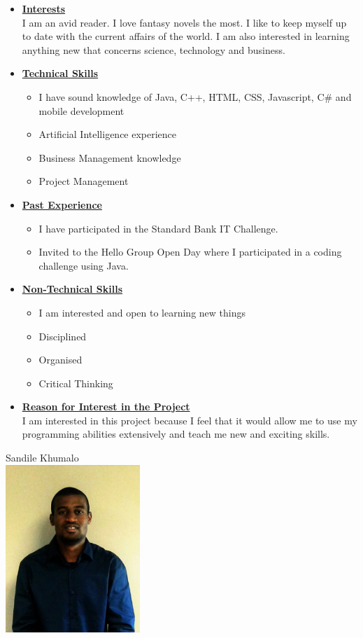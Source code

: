 \documentclass[a4paper,12pt]{article}
\begin{document}
\begin{itemize}
\item {\large \underline{\textbf{Interests}}}\\[0.2cm]
I am an avid reader. I love fantasy novels the most. I like to keep myself up to date with the current affairs of the world. I am also interested in learning anything new that concerns science, technology and business.
\\
\item {\large \underline{\textbf{Technical Skills}}}
	\begin{itemize}
		\item I have sound knowledge of Java, C++, HTML, CSS, Javascript, C\# and mobile development 
		\item Artificial Intelligence experience
		\item Business Management knowledge
		\item Project Management
	\end{itemize}
\bigskip
\item {\large \underline{\textbf{Past Experience}}}
\begin{itemize}
\item I have participated in the Standard Bank IT Challenge.
\item Invited to the Hello Group Open Day where I participated in a coding challenge using Java.
\end{itemize}
\bigskip
\item {\large \underline{\textbf{Non-Technical Skills}}}
\begin{itemize}
\item I am interested and open to learning new things
\item Disciplined
\item Organised
\item Critical Thinking
\end{itemize}
\bigskip
\item {\large \underline{\textbf{Reason for Interest in the Project}}}\\[0.2cm]
I am interested in this project because I feel that it would allow me to use my programming abilities extensively and teach me new and exciting skills.

\newpage
\end{itemize}
\begin{center}
{\Large Sandile {Khumalo}} \\[0.3cm]
\includegraphics[width=2in]{Sandile.jpg}\\[0.4cm] 
\end{center}
\end{document}
